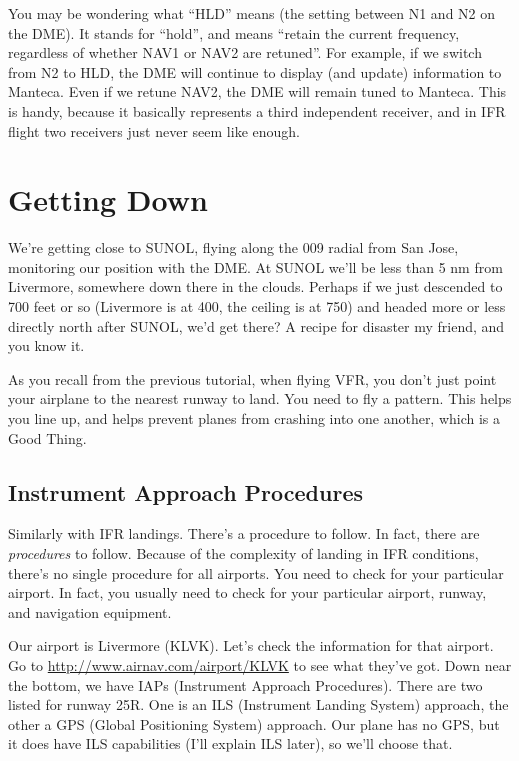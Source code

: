 
You may be wondering what ``HLD'' means (the setting between N1 and N2
on the DME).  It stands for ``hold'', and means ``retain the current
frequency, regardless of whether NAV1 or NAV2 are retuned''.  For
example, if we switch from N2 to HLD, the DME will continue to display
(and update) information to Manteca.  Even if we retune NAV2, the DME
will remain tuned to Manteca.  This is handy, because it basically
represents a third independent receiver, and in IFR flight two
receivers just never seem like enough.


\section{Getting Down}

We're getting close to SUNOL, flying along the 009 radial from San
Jose, monitoring our position with the DME.  At SUNOL we'll be less
than 5 nm from Livermore, somewhere down there in the clouds.  Perhaps
if we just descended to 700 feet or so (Livermore is at 400, the
ceiling is at 750) and headed more or less directly north after SUNOL,
we'd get there?  A recipe for disaster my friend, and you know it.

As you recall from the previous tutorial, when flying VFR, you don't
just point your airplane to the nearest runway to land.  You need to
fly a pattern.  This helps you line up, and helps prevent planes from
crashing into one another, which is a Good Thing.

\subsection{Instrument Approach Procedures}

Similarly with IFR landings.  There's a procedure to follow.  In fact,
there are \emph{procedures} to follow.  Because of the complexity of
landing in IFR conditions, there's no single procedure for all
airports.  You need to check for your particular airport.  In fact,
you usually need to check for your particular airport, runway, and
navigation equipment.

Our airport is Livermore (KLVK).  Let's check the information for that
airport.  Go to \url{http://www.airnav.com/airport/KLVK} to see what
they've got.  Down near the bottom, we have IAPs (Instrument Approach
Procedures).  There are two listed for runway 25R.  One is an ILS
(Instrument Landing System) approach, the other a GPS (Global
Positioning System) approach.  Our plane has no GPS, but it does have
ILS capabilities (I'll explain ILS later), so we'll choose that.

